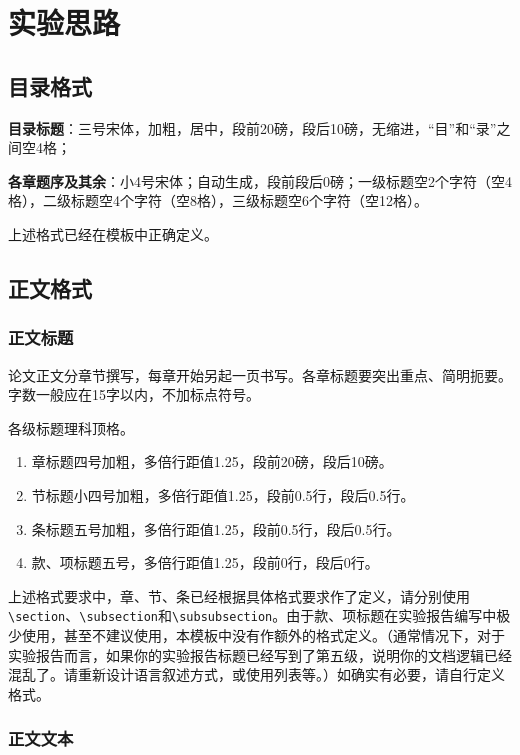 \section{实验思路}

\subsection{目录格式}

\textbf{目录标题}：三号宋体，加粗，居中，段前20磅，段后10磅，无缩进，“目”和“录”之间空4格；

\textbf{各章题序及其余}：小4号宋体；自动生成，段前段后0磅；一级标题空2个字符（空4格），二级标题空4个字符（空8格），三级标题空6个字符（空12格）。

上述格式已经在模板中正确定义。

\subsection{正文格式}

\subsubsection{正文标题}

论文正文分章节撰写，每章开始另起一页书写。各章标题要突出重点、简明扼要。字数一般应在15字以内，不加标点符号。

各级标题理科顶格。

\begin{enumerate}
    \item 章标题四号加粗，多倍行距值1.25，段前20磅，段后10磅。
    \item 节标题小四号加粗，多倍行距值1.25，段前0.5行，段后0.5行。
    \item 条标题五号加粗，多倍行距值1.25，段前0.5行，段后0.5行。
    \item 款、项标题五号，多倍行距值1.25，段前0行，段后0行。
\end{enumerate}

上述格式要求中，章、节、条已经根据具体格式要求作了定义，请分别使用\texttt{\textbackslash section}、\texttt{\textbackslash subsection}和\texttt{\textbackslash subsubsection}。由于款、项标题在实验报告编写中极少使用，甚至不建议使用，本模板中没有作额外的格式定义。（通常情况下，对于实验报告而言，如果你的实验报告标题已经写到了第五级，说明你的文档逻辑已经混乱了。请重新设计语言叙述方式，或使用列表等。）如确实有必要，请自行定义格式。

\subsubsection{正文文本}

